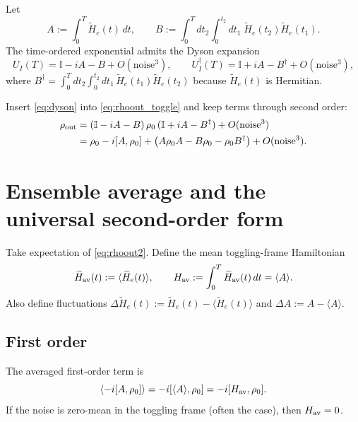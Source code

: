 \documentclass[11pt]{article}
\newcommand{\id}{\mathbb{I}}
\begin{document}
Let
\begin{equation}
A := \int_0^T \widetilde H_e(t)\,dt,
\qquad
B := \int_0^T\!dt_2\int_0^{t_2}\!dt_1\; \widetilde H_e(t_2)\widetilde H_e(t_1).
\end{equation}
The time-ordered exponential admits the Dyson expansion
\begin{equation}
U_I(T)=\id - iA - B + O(\text{noise}^3),
\qquad
U_I^\dagger(T)=\id + iA - B^\dagger + O(\text{noise}^3),
\label{eq:dyson}
\end{equation}
where $B^\dagger=\int_0^T dt_2\int_0^{t_2}dt_1\,\widetilde H_e(t_1)\widetilde H_e(t_2)$ because $\widetilde H_e(t)$ is Hermitian.

Insert \eqref{eq:dyson} into \eqref{eq:rhoout_toggle} and keep terms through second order:
\begin{align}
\rho_{\rm out}
&= (\id - iA - B)\,\rho_0\,(\id + iA - B^\dagger) + O(\text{noise}^3)\nonumber\\
&= \rho_0 - i[A,\rho_0] + \big(A\rho_0A - B\rho_0 - \rho_0B^\dagger\big) + O(\text{noise}^3).
\label{eq:rhoout2}
\end{align}

\section{Ensemble average and the universal second-order form}

Take expectation of \eqref{eq:rhoout2}. Define the mean toggling-frame Hamiltonian
\begin{equation}
\widetilde H_{\rm av}(t):=\langle \widetilde H_e(t)\rangle,
\qquad
H_{\rm av}:=\int_0^T \widetilde H_{\rm av}(t)\,dt=\langle A\rangle.
\label{eq:Hav}
\end{equation}
Also define fluctuations $\Delta \widetilde H_e(t):=\widetilde H_e(t)-\langle \widetilde H_e(t)\rangle$ and $\Delta A:=A-\langle A\rangle$.

\subsection{First order}
The averaged first-order term is
\begin{equation}
\langle -i[A,\rho_0]\rangle = -i[\langle A\rangle,\rho_0] = -i[H_{\rm av},\rho_0].
\end{equation}
If the noise is zero-mean in the toggling frame (often the case), then $H_{\rm av}=0$.
\end{document}
